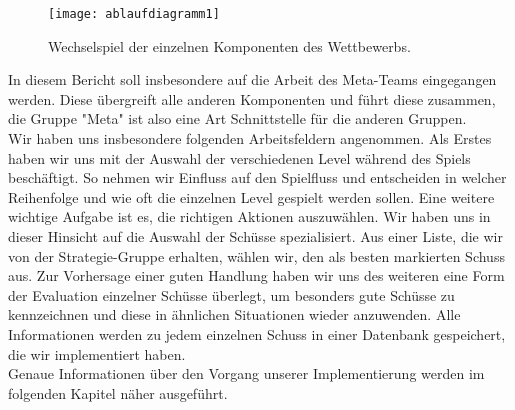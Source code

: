 \begin{figure} [h]
	\begin{center}
		\texttt{[image: ablaufdiagramm1]}
		\caption{Wechselspiel der einzelnen Komponenten des Wettbewerbs.}
	\end{center}
\end{figure}

In diesem Bericht soll insbesondere auf die Arbeit des Meta-Teams eingegangen werden. Diese übergreift alle anderen Komponenten und führt diese zusammen, die Gruppe "Meta" ist also eine Art Schnittstelle für die anderen Gruppen.\\
Wir haben uns insbesondere folgenden Arbeitsfeldern angenommen. Als Erstes haben wir uns mit der Auswahl der verschiedenen Level während des Spiels beschäftigt. So nehmen wir Einfluss auf den Spielfluss und entscheiden in welcher Reihenfolge und wie oft die einzelnen Level gespielt werden sollen.
Eine weitere wichtige Aufgabe ist es, die richtigen Aktionen auszuwählen. Wir haben uns in dieser Hinsicht auf die Auswahl der Schüsse spezialisiert. Aus einer Liste, die wir von der Strategie-Gruppe erhalten, wählen wir, den als besten markierten Schuss aus. Zur Vorhersage einer guten Handlung haben wir uns des weiteren eine Form der Evaluation einzelner Schüsse überlegt, um besonders gute Schüsse zu kennzeichnen und diese in ähnlichen Situationen wieder anzuwenden.
Alle Informationen werden zu jedem einzelnen Schuss in einer Datenbank gespeichert, die wir implementiert haben.\\
Genaue Informationen über den Vorgang unserer Implementierung werden im folgenden Kapitel näher ausgeführt.